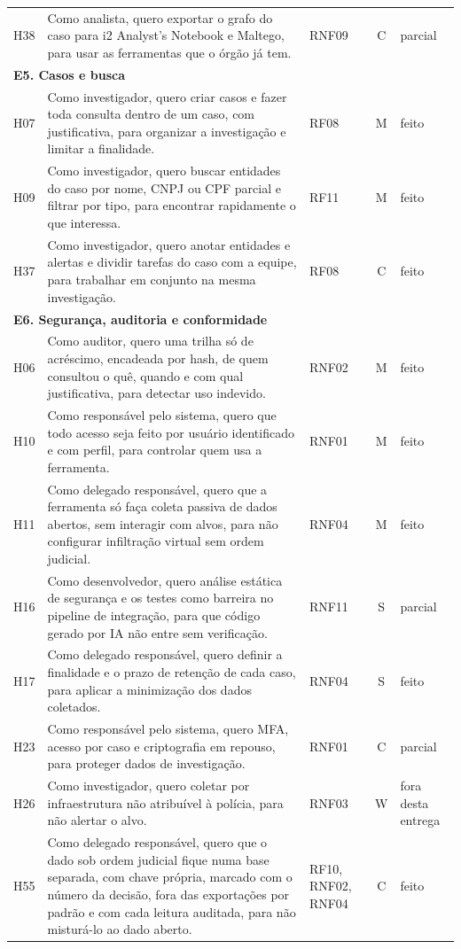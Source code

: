 \begin{small}
\begin{longtable}{lp{7.9cm}p{1.3cm}cp{1.9cm}}
H38 & Como analista, quero exportar o grafo do caso para i2 Analyst's Notebook e Maltego, para usar as ferramentas que o órgão já tem. & RNF09 & C & parcial \\
\multicolumn{5}{l}{\textbf{E5. Casos e busca}} \\
H07 & Como investigador, quero criar casos e fazer toda consulta dentro de um caso, com justificativa, para organizar a investigação e limitar a finalidade. & RF08 & M & feito \\
H09 & Como investigador, quero buscar entidades do caso por nome, CNPJ ou CPF parcial e filtrar por tipo, para encontrar rapidamente o que interessa. & RF11 & M & feito \\
H37 & Como investigador, quero anotar entidades e alertas e dividir tarefas do caso com a equipe, para trabalhar em conjunto na mesma investigação. & RF08 & C & feito \\
\multicolumn{5}{l}{\textbf{E6. Segurança, auditoria e conformidade}} \\
H06 & Como auditor, quero uma trilha só de acréscimo, encadeada por hash, de quem consultou o quê, quando e com qual justificativa, para detectar uso indevido. & RNF02 & M & feito \\
H10 & Como responsável pelo sistema, quero que todo acesso seja feito por usuário identificado e com perfil, para controlar quem usa a ferramenta. & RNF01 & M & feito \\
H11 & Como delegado responsável, quero que a ferramenta só faça coleta passiva de dados abertos, sem interagir com alvos, para não configurar infiltração virtual sem ordem judicial. & RNF04 & M & feito \\
H16 & Como desenvolvedor, quero análise estática de segurança e os testes como barreira no pipeline de integração, para que código gerado por IA não entre sem verificação. & RNF11 & S & parcial \\
H17 & Como delegado responsável, quero definir a finalidade e o prazo de retenção de cada caso, para aplicar a minimização dos dados coletados. & RNF04 & S & feito \\
H23 & Como responsável pelo sistema, quero MFA, acesso por caso e criptografia em repouso, para proteger dados de investigação. & RNF01 & C & parcial \\
H26 & Como investigador, quero coletar por infraestrutura não atribuível à polícia, para não alertar o alvo. & RNF03 & W & fora desta entrega \\
H55 & Como delegado responsável, quero que o dado sob ordem judicial fique numa base separada, com chave própria, marcado com o número da decisão, fora das exportações por padrão e com cada leitura auditada, para não misturá-lo ao dado aberto. & RF10, RNF02, RNF04 & C & feito \\

\end{longtable}
\end{small}

